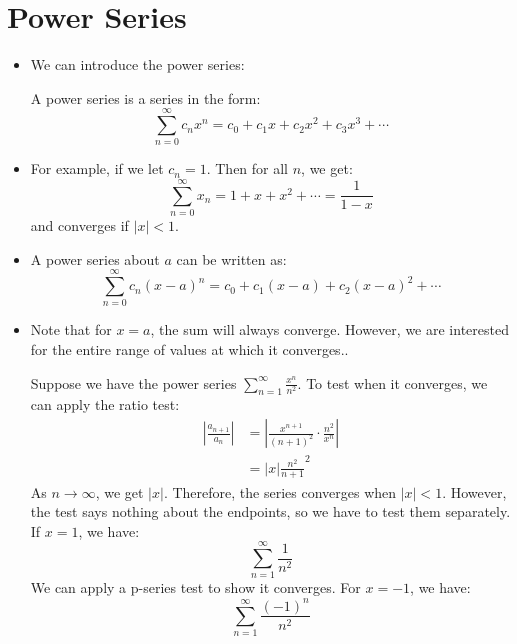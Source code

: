 \section{Power Series}
\begin{itemize}
    \item We can introduce the power series:
    \begin{definition}
        A power series is a series in the form:
        \begin{equation}
            \sum_{n=0}^\infty c_n x^n = c_0 + c_1x+c_2x^2+c_3x^3 + \cdots
        \end{equation}
    \end{definition}
    \item For example, if we let $c_n=1$. Then for all $n$, we get:
    \begin{equation}
        \sum_{n=0}^\infty x_n = 1 + x + x^2 + \cdots = \frac{1}{1-x}
    \end{equation}
    and converges if $|x|<1$.
    \item A power series about $a$ can be written as:
    \begin{equation}
        \sum_{n=0}^\infty c_n(x-a)^n = c_0 + c_1(x-a)+c_2(x-a)^2 + \cdots
    \end{equation}
    \item Note that for $x=a$, the sum will always converge. However, we are interested for the entire range of values at which it converges..
    \begin{example}
        Suppose we have the power series $\sum_{n=1}^\infty \frac{x^n}{n^2}$. To test when it converges, we can apply the ratio test:
        \begin{align}
            \left|\frac{a_{n+1}}{a_n}\right| &= \left|\frac{x^{n+1}}{(n+1)^2} \cdot \frac{n^2}{x^n}\right| \\ 
            &= |x| \frac{n^2}{n+1}^2
        \end{align}
        As $n\to\infty$, we get $|x|$. Therefore, the series converges when $|x|<1$. However, the test says nothing about the endpoints, so we have to test them separately. If $x=1$, we have:
        \begin{equation}
            \sum_{n=1}^{\infty} \frac{1}{n^2}
        \end{equation}
        We can apply a p-series test to show it converges. For $x=-1$, we have:
        \begin{equation}
            \sum_{n=1}^\infty \frac{(-1)^n}{n^2}
        \end{equation}

\end{example}
\end{itemize}
